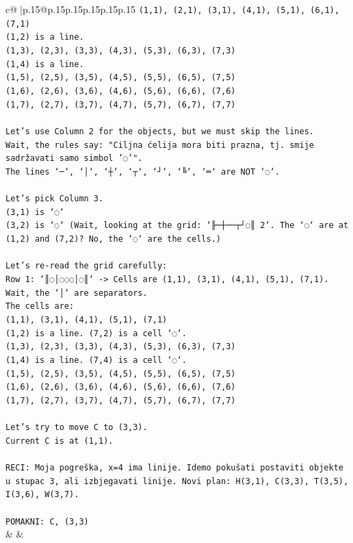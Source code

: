 \documentclass{article}
\begin{document}
{\begin{supertabular}{c@{$\;$}|p{.15\linewidth}@{}p{.15\linewidth}p{.15\linewidth}p{.15\linewidth}p{.15\linewidth}p{.15\linewidth}}
{{{\texttt{(1,1), (2,1), (3,1), (4,1), (5,1), (6,1), (7,1)} \\
\texttt{(1,2) is a line.} \\
\texttt{(1,3), (2,3), (3,3), (4,3), (5,3), (6,3), (7,3)} \\
\texttt{(1,4) is a line.} \\
\texttt{(1,5), (2,5), (3,5), (4,5), (5,5), (6,5), (7,5)} \\
\texttt{(1,6), (2,6), (3,6), (4,6), (5,6), (6,6), (7,6)} \\
\texttt{(1,7), (2,7), (3,7), (4,7), (5,7), (6,7), (7,7)} \\
\\ 
\texttt{Let's use Column 2 for the objects, but we must skip the lines.} \\
\texttt{Wait, the rules say: "Ciljna ćelija mora biti prazna, tj. smije sadržavati samo simbol '◌'".} \\
\texttt{The lines `─`, `│`, `┼`, `┬`, `┘`, `╚`, `═` are NOT `◌`.} \\
\\ 
\texttt{Let's pick Column 3.} \\
\texttt{(3,1) is `◌`} \\
\texttt{(3,2) is `◌` (Wait, looking at the grid: `╟─┼──┬┘◌║ 2`. The `◌` are at (1,2) and (7,2)? No, the `◌` are the cells.)} \\
\\ 
\texttt{Let's re{-}read the grid carefully:} \\
\texttt{Row 1: `║◌│◌◌◌│◌║` {-}> Cells are (1,1), (3,1), (4,1), (5,1), (7,1).} \\
\texttt{Wait, the `│` are separators.} \\
\texttt{The cells are:} \\
\texttt{(1,1), (3,1), (4,1), (5,1), (7,1)} \\
\texttt{(1,2) is a line. (7,2) is a cell `◌`.} \\
\texttt{(1,3), (2,3), (3,3), (4,3), (5,3), (6,3), (7,3)} \\
\texttt{(1,4) is a line. (7,4) is a cell `◌`.} \\
\texttt{(1,5), (2,5), (3,5), (4,5), (5,5), (6,5), (7,5)} \\
\texttt{(1,6), (2,6), (3,6), (4,6), (5,6), (6,6), (7,6)} \\
\texttt{(1,7), (2,7), (3,7), (4,7), (5,7), (6,7), (7,7)} \\
\\ 
\texttt{Let's try to move C to (3,3).} \\
\texttt{Current C is at (1,1).} \\
\\ 
\texttt{RECI: Moja pogreška, x=4 ima linije. Idemo pokušati postaviti objekte u stupac 3, ali izbjegavati linije. Novi plan: H(3,1), C(3,3), T(3,5), I(3,6), W(3,7).} \\
\\ 
\texttt{POMAKNI: C, (3,3)} \\
            }
        }
    }
    & & \\ \\


\end{supertabular}}
\end{document}
